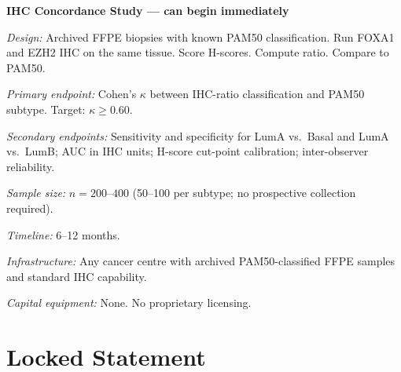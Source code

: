 \documentclass[12pt, a4paper]{article}
\begin{document}
\begin{center}
\colorbox{lockbox}{
\begin{minipage}{0.85\textwidth}
\vspace{0.5em}
\textbf{IHC Concordance Study --- can begin immediately}

\textit{Design:} Archived FFPE biopsies with known PAM50
classification. Run FOXA1 and EZH2 IHC on the same tissue.
Score H-scores. Compute ratio. Compare to PAM50.

\textit{Primary endpoint:} Cohen's $\kappa$ between IHC-ratio
classification and PAM50 subtype. Target: $\kappa \geq 0.60$.

\textit{Secondary endpoints:} Sensitivity and specificity for
LumA vs.\ Basal and LumA vs.\ LumB; AUC in IHC units;
H-score cut-point calibration; inter-observer reliability.

\textit{Sample size:} $n = 200$--$400$
(50--100 per subtype; no prospective collection required).

\textit{Timeline:} 6--12 months.

\textit{Infrastructure:} Any cancer centre with archived
PAM50-classified FFPE samples and standard IHC capability.

\textit{Capital equipment:} None. No proprietary licensing.
\vspace{0.5em}
\end{minipage}
}
\end{center}

\section{Locked Statement}
\end{document}
